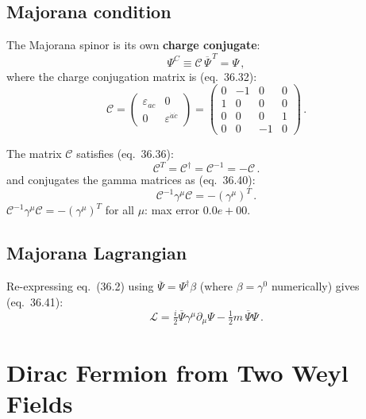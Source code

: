 \documentclass[12pt]{article}
\newcommand{\verified}[1]{\textcolor{verifygreen}{\checkmark\; #1}}
\begin{document}
\subsection{Majorana condition}

The Majorana spinor is its own \textbf{charge conjugate}:
\begin{equation}
  \Psi^C \equiv \mathcal{C}\,\overline{\Psi}^{\,T} = \Psi\,,
\end{equation}
where the charge conjugation matrix is (eq.~36.32):
\begin{equation}
  \mathcal{C} = \begin{pmatrix}\varepsilon_{ac}&0\\0&\varepsilon^{\dot{a}\dot{c}}\end{pmatrix}
  = \begin{pmatrix}0 & -1 & 0 & 0 \\ 1 & 0 & 0 & 0 \\ 0 & 0 & 0 & 1 \\ 0 & 0 & -1 & 0\end{pmatrix}\,.
  \tag{36.32}
\end{equation}

The matrix $\mathcal{C}$ satisfies (eq.~36.36):
\begin{equation}
  \mathcal{C}^T = \mathcal{C}^\dagger = \mathcal{C}^{-1} = -\mathcal{C}\,.
  \tag{36.36}
\end{equation}
and conjugates the gamma matrices as (eq.~36.40):
\begin{equation}
  \mathcal{C}^{-1}\gamma^\mu\mathcal{C} = -(\gamma^\mu)^T\,.
  \tag{36.40}
\end{equation}
\verified{$\mathcal{C}^{-1}\gamma^\mu\mathcal{C}=-(\gamma^\mu)^T$
for all $\mu$: max error $0.0e+00$.}

\subsection{Majorana Lagrangian}

Re-expressing eq.~(36.2) using $\overline{\Psi}=\Psi^\dagger\beta$ (where $\beta=\gamma^0$
numerically) gives (eq.~36.41):
\begin{equation}
  \mathcal{L} = \tfrac{i}{2}\overline{\Psi}\gamma^\mu\partial_\mu\Psi
              - \tfrac{1}{2}m\,\overline{\Psi}\Psi\,.
  \tag{36.41}
\end{equation}

\section{Dirac Fermion from Two Weyl Fields}
\end{document}

